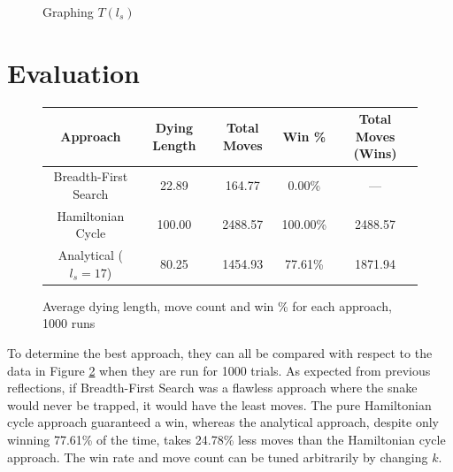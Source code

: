 \documentclass[12pt]{article}
\begin{document}
\begin{figure}[!h]
\centering
	\caption{Graphing $T(l_s)$}
	\label{fig:T_l_final_graph}
\end{figure}

\section{Evaluation}

\begin{figure}[!h]
\centering
	\begin{tabular}{ || c | c | c | c | c ||}
	\hline
	Approach & Dying Length & Total Moves & Win \% & Total Moves (Wins)\\
	\hline
	\hline
	Breadth-First Search & 22.89 & 164.77 & 0.00\% & —\\
	\hline		
	Hamiltonian Cycle & 100.00 & 2488.57 & 100.00\% & 2488.57\\
	\hline		
	Analytical ($l_s=17$) & 80.25 & 1454.93 & 77.61\% & 1871.94\\
	\hline		
	\end{tabular}
	\caption{Average dying length, move count and win \% for each approach, 1000 runs}
	\label{fig:approach_comparison}
\end{figure}

To determine the best approach, they can all be compared with respect to the data in Figure \ref{fig:approach_comparison} when they are run for 1000 trials. As expected from previous reflections, if Breadth-First Search was a flawless approach where the snake would never be trapped, it would have the least moves. The pure Hamiltonian cycle approach guaranteed a win, whereas the analytical approach, despite only winning 77.61\% of the time, takes 24.78\% less moves than the Hamiltonian cycle approach. The win rate and move count can be tuned arbitrarily by changing $k$.
\end{document}
